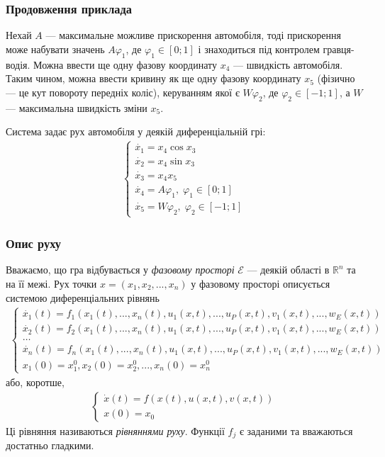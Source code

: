 \documentclass[10pt,pdf]{beamer}
\newcommand{\R}{\mathbb{R}}
\newcommand{\vf}{\varphi}
\renewcommand{\d}[1]{\dot{#1}}
\newcommand{\E}{\mathcal{E}}
\renewcommand{\l}{\left}
\renewcommand{\r}{\right}
\begin{document}
    \begin{frame}
        \frametitle{Продовження приклада}

        Нехай $A$ --- максимальне можливе прискорення автомобіля, тоді прискорення може набувати значень
        $A \vf_1$, де $\vf_1 \in [0; 1]$ і знаходиться під контролем гравця-водія. Можна ввести ще одну фазову координату $x_4$ --- швидкість автомобіля.
        Таким чином, можна ввести кривину як ще одну фазову координату $x_5$
        (фізично --- це кут повороту передніх коліс), керуванням якої є $W \vf_2$, де $\vf_2 \in [-1; 1]$, а $W$ --- максимальна швидкість зміни $x_5$.

        Система задає рух автомобіля у деякій диференціальній грі:
        \begin{gather*}
            \begin{cases}
                \d{x_1} = x_4 \cos{x_3} \\
                \d{x_2} = x_4 \sin{x_3} \\
                \d{x_3} = x_4 x_5 \\
                \d{x_4} = A \vf_1, \; \vf_1 \in [0; 1] \\
                \d{x_5} = W \vf_2, \; \vf_2 \in [-1; 1]
            \end{cases}
        \end{gather*}
    \end{frame}
    \begin{frame}
        \frametitle{Опис руху}
    
        Вважаємо, що гра відбувається у \emph{фазовому просторі} $\E$ --- деякій області в $\R^n$ та на її межі.
        Рух точки $x = \l(x_1, x_2, ..., x_n \r)$ у фазовому просторі описується системою диференціальних рівнянь
        \begin{gather*}\label{eq_1}
            \begin{cases}
                \d{x_1}(t) = f_1(x_1(t), ..., x_n(t), u_1(x, t), ..., u_P(x, t), v_1(x, t), ..., w_E(x, t)) \\
                \d{x_2}(t) = f_2(x_1(t), ..., x_n(t), u_1(x, t), ..., u_P(x, t), v_1(x, t), ..., w_E(x, t)) \\
                \dots \\
                \d{x_n}(t) = f_n(x_1(t), ..., x_n(t), u_1(x, t), ..., u_P(x, t), v_1(x, t), ..., w_E(x, t)) \\
                x_1(0) = x_1^0, x_2(0) = x_2^0, ..., x_n(0) = x_n^0
            \end{cases}
        \end{gather*}
        або, коротше,
        \begin{gather*}\label{eq_2}
            \begin{cases}
                \d{x}(t) = {f}(x(t), u(x, t), v(x, t)) \\
                x(0) = x_0
            \end{cases}
        \end{gather*}
        Ці рівняння називаються \emph{рівняннями руху}. Функції $f_j$ є заданими та вважаються достатньо гладкими.
    \end{frame}
\end{document}
